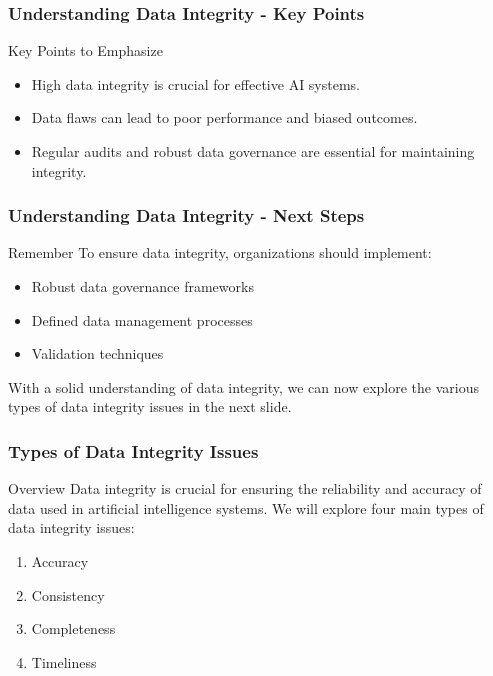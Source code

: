 \documentclass{beamer}
\begin{document}
\begin{frame}[fragile]
    \frametitle{Understanding Data Integrity - Key Points}
    \begin{block}{Key Points to Emphasize}
        \begin{itemize}
            \item High data integrity is crucial for effective AI systems.
            \item Data flaws can lead to poor performance and biased outcomes.
            \item Regular audits and robust data governance are essential for maintaining integrity.
        \end{itemize}
    \end{block}
\end{frame}

\begin{frame}[fragile]
    \frametitle{Understanding Data Integrity - Next Steps}
    \begin{block}{Remember}
        To ensure data integrity, organizations should implement:
        \begin{itemize}
            \item Robust data governance frameworks
            \item Defined data management processes
            \item Validation techniques
        \end{itemize}
    \end{block}
    With a solid understanding of data integrity, we can now explore the various types of data integrity issues in the next slide.
\end{frame}

\begin{frame}[fragile]
    \frametitle{Types of Data Integrity Issues}
    
    \begin{block}{Overview}
        Data integrity is crucial for ensuring the reliability and accuracy of data used in artificial intelligence systems. 
        We will explore four main types of data integrity issues:
        \begin{enumerate}
            \item Accuracy
            \item Consistency
            \item Completeness
            \item Timeliness
        \end{enumerate}
    \end{block}
\end{frame}
\end{document}
